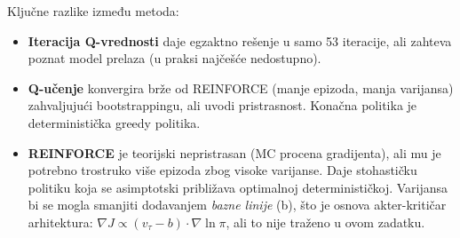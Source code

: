 \documentclass[12pt,a4paper]{article}
\begin{document}
Ključne razlike između metoda:
\begin{itemize}
  \item \textbf{Iteracija Q-vrednosti} daje egzaktno rešenje u samo 53 iteracije,
    ali zahteva poznat model prelaza (u praksi najčešće nedostupno).
  \item \textbf{Q-učenje} konvergira brže od REINFORCE (manje epizoda, manja varijansa)
    zahvaljujući bootstrappingu, ali uvodi pristrasnost.
    Konačna politika je deterministička greedy politika.
  \item \textbf{REINFORCE} je teorijski nepristrasan (MC procena gradijenta),
    ali mu je potrebno trostruko više epizoda zbog visoke varijanse.
    Daje stohastičku politiku koja se asimptotski približava optimalnoj determinističkoj.
    Varijansa bi se mogla smanjiti dodavanjem \emph{bazne linije} (b),
    što je osnova akter-kritičar arhitektura:
    $\nabla J \propto (v_\tau - b) \cdot \nabla\ln\pi$, ali to nije traženo u ovom zadatku.
\end{itemize}
\end{document}

